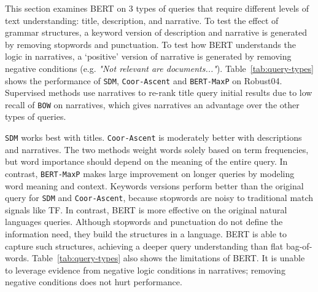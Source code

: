 \documentclass[sigconf]{acmart}
\begin{document}
This section examines BERT on 3 types of queries that require different levels of text understanding: title, description, and narrative.  To test the effect of grammar structures, a keyword version of description and narrative is generated by removing stopwords and punctuation. To test how BERT understands the logic in narratives, a `positive' version of narrative is generated by removing negative conditions (e.g. \textit{"Not relevant are documents..."}).
Table~\ref{tab:query-types} shows the performance of \texttt{SDM}, \texttt{Coor-Ascent} and \texttt{BERT-MaxP} on Robust04. Supervised methods use narratives to re-rank title query initial results due to low recall of \texttt{BOW} on narratives, which gives narratives 
an advantage over the other types of queries.

\texttt{SDM} works best with titles. \texttt{Coor-Ascent} is moderately better with descriptions and narratives. The two methods weight words solely based on term frequencies, but word importance should depend on the meaning of the entire query. In contrast, \texttt{BERT-MaxP} makes large improvement on longer queries by modeling word meaning and context. Keywords versions perform better than the original query for \texttt{SDM} and \texttt{Coor-Ascent}, because stopwords are noisy to traditional match signals like TF.
In contrast, BERT is more effective on the original natural languages queries. Although stopwords and punctuation do not define the information need, they build the structures in a language. BERT is able to capture such structures, achieving a deeper query understanding than flat bag-of-words. Table~\ref{tab:query-types} also shows the limitations of BERT. It is unable to leverage evidence from negative logic conditions in narratives; removing negative conditions does not hurt performance. 
\end{document}
